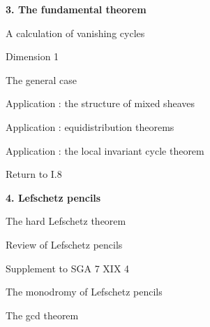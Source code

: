 \documentclass[11pt,leqno]{article}
\begin{document}
\medskip
\noindent\textbf{3. The fundamental theorem}\dotfill{}\par
\noindent\hspace*{1em}A calculation of vanishing cycles\dotfill{}\par
\noindent\hspace*{1em}Dimension 1\dotfill{}\par
\noindent\hspace*{1em}The general case\dotfill{}\par
\noindent\hspace*{1em}Application : the structure of mixed sheaves\dotfill{}\par
\noindent\hspace*{1em}Application : equidistribution theorems\dotfill{}\par
\noindent\hspace*{1em}Application : the local invariant cycle theorem\dotfill{}\par
\noindent\hspace*{1em}Return to I.8\dotfill{}\par
\medskip
\noindent\textbf{4. Lefschetz pencils}\dotfill{}\par
\noindent\hspace*{1em}The hard Lefschetz theorem\dotfill{}\par
\noindent\hspace*{1em}Review of Lefschetz pencils\dotfill{}\par
\noindent\hspace*{1em}Supplement to SGA 7 XIX 4\dotfill{}\par
\noindent\hspace*{1em}The monodromy of Lefschetz pencils\dotfill{}\par
\noindent\hspace*{1em}The gcd theorem\dotfill{}\par
\endgroup
\end{document}
